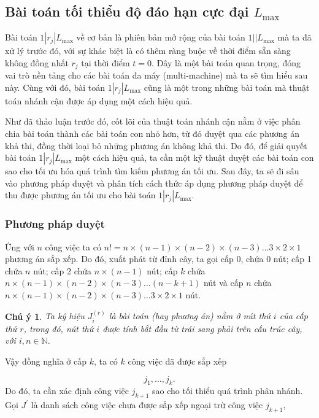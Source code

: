 \documentclass[12pt,a4paper]{report}
\newtheorem{cy}{Chú ý}
\begin{document}
\subsection{Bài toán tối thiểu độ đáo hạn cực đại $L_{\max}$}

Bài toán $1|r_j|L_{\max}$ về cơ bản là phiên bản mở rộng của bài toán $1||L_{\max}$ mà ta đã xử lý trước đó, với sự khác biệt là có thêm ràng buộc về thời điểm sẵn sàng không đồng nhất $r_j$ tại thời điểm $t=0$. Đây là một bài toán quan trọng, đóng vai trò nền tảng cho các bài toán đa máy (multi-machine) mà ta sẽ tìm hiểu sau này. Cùng với đó, bài toán $1|r_j|L_{\max}$ cũng là một trong những bài toán mà thuật toán nhánh cận được áp dụng một cách hiệu quả.

Như đã thảo luận trước đó, cốt lõi của thuật toán nhánh cận nằm ở việc phân chia bài toán thành các bài toán con nhỏ hơn, từ đó duyệt qua các phương án khả thi, đồng thời loại bỏ những phương án không khả thi. Do đó, để giải quyết bài toán $1|r_j|L_{\max}$ một cách hiệu quả, ta cần một kỹ thuật duyệt các bài toán con sao cho tối ưu hóa quá trình tìm kiếm phương án tối ưu. Sau đây, ta sẽ đi sâu vào phương pháp duyệt và phân tích cách thức áp dụng phương pháp duyệt để thu được phương án tối ưu cho bài toán $1|r_j|L_{\max}$.

\subsubsection*{Phương pháp duyệt}

Ứng với $n$ công việc ta có $n! = n \times (n-1) \times (n-2) \times (n-3) \ldots 3 \times 2 \times 1$ phương án sắp xếp. Do đó, xuất phát từ đỉnh cây, ta gọi cấp 0, chứa 0 nút; cấp 1 chứa $n$ nút; cấp 2 chứa $n \times (n-1)$ nút; cấp $k$ chứa $n \times (n-1) \times (n-2) \times (n-3) \ldots (n-k+1)$ nút và cấp $n$ chứa $n \times (n-1) \times (n-2) \times (n-3) \ldots 3 \times 2 \times 1$ nút.

\begin{cy}
Ta ký hiệu $J_i^{(r)}$ là bài toán (hay phương án) nằm ở nút thứ $i$ của cấp thứ $r$, trong đó, nút thứ $i$ được tính bắt đầu từ trái sang phải trên cấu trúc cây, với $i, n \in \mathbb{N}$.
\end{cy}

Vậy đồng nghĩa ở cấp $k$, ta có $k$ công việc đã được sắp xếp

\begin{equation*}
j_1,\ldots ,j_k.
\end{equation*}
Do đó, ta cần xác định công việc $j_{k+1}$ sao cho tối thiểu quá trình phân nhánh. Gọi $J^{'}$ là danh sách công việc chưa được sắp xếp ngoại trừ công việc $j_{k+1}$,
\end{document}
